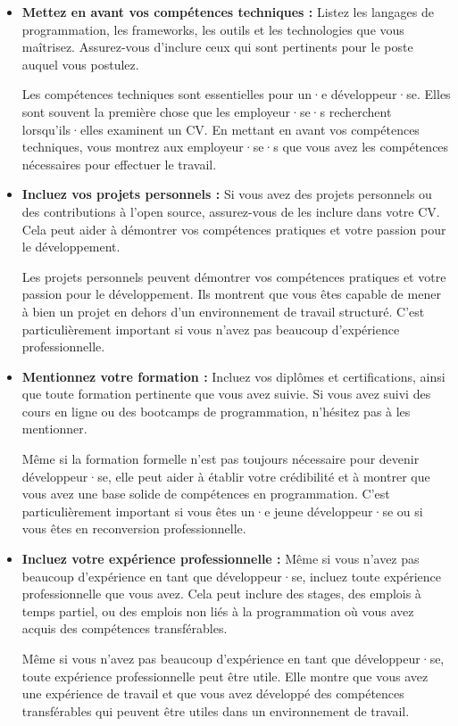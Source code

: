 \begin{itemize}
    \item \textbf{Mettez en avant vos compétences techniques :} Listez les langages de programmation, les frameworks, les outils et les technologies que vous maîtrisez. Assurez-vous d'inclure ceux qui sont pertinents pour le poste auquel vous postulez.

    Les compétences techniques sont essentielles pour un·e développeur·se. Elles sont souvent la première chose que les employeur·se·s recherchent lorsqu'ils·elles examinent un CV. En mettant en avant vos compétences techniques, vous montrez aux employeur·se·s que vous avez les compétences nécessaires pour effectuer le travail.

    \item \textbf{Incluez vos projets personnels :} Si vous avez des projets personnels ou des contributions à l'open source, assurez-vous de les inclure dans votre CV. Cela peut aider à démontrer vos compétences pratiques et votre passion pour le développement.

    Les projets personnels peuvent démontrer vos compétences pratiques et votre passion pour le développement. Ils montrent que vous êtes capable de mener à bien un projet en dehors d'un environnement de travail structuré. C'est particulièrement important si vous n'avez pas beaucoup d'expérience professionnelle.

    \item \textbf{Mentionnez votre formation :} Incluez vos diplômes et certifications, ainsi que toute formation pertinente que vous avez suivie. Si vous avez suivi des cours en ligne ou des bootcamps de programmation, n'hésitez pas à les mentionner.

    Même si la formation formelle n'est pas toujours nécessaire pour devenir développeur·se, elle peut aider à établir votre crédibilité et à montrer que vous avez une base solide de compétences en programmation. C'est particulièrement important si vous êtes un·e jeune développeur·se ou si vous êtes en reconversion professionnelle.

    \item \textbf{Incluez votre expérience professionnelle :} Même si vous n'avez pas beaucoup d'expérience en tant que développeur·se, incluez toute expérience professionnelle que vous avez. Cela peut inclure des stages, des emplois à temps partiel, ou des emplois non liés à la programmation où vous avez acquis des compétences transférables.

    Même si vous n'avez pas beaucoup d'expérience en tant que développeur·se, toute expérience professionnelle peut être utile. Elle montre que vous avez une expérience de travail et que vous avez développé des compétences transférables qui peuvent être utiles dans un environnement de travail.


\end{itemize}
